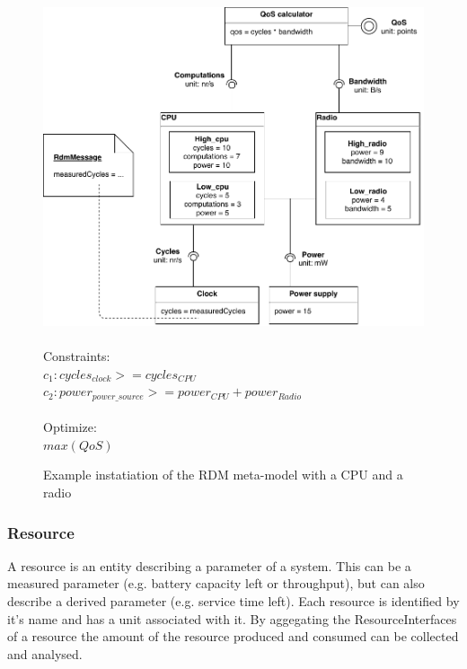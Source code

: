 \begin{figure}
\begingroup\centering
  \includegraphics[width=\linewidth]{resources/img/rdm_cpu_radio.pdf}\endgroup \\ \\
  \noindent Constraints: \\
$c_1: cycles_{clock} >= cycles_{CPU}$ \\
$c_2: power_{power\_source} >= power_{CPU}+power_{Radio} $ \\ \\
\noindent Optimize:\\$max(QoS)$
\caption{Example instatiation of the RDM meta-model with a CPU and a radio}
  \label{fig:rdm_cpu_radio}
\end{figure}

\subsubsection{Resource}
A resource is an entity describing a parameter of a system. This can be a measured parameter (e.g. battery capacity left or throughput), but can also describe a derived parameter (e.g. service time left). Each resource is identified by it's name and has a unit associated with it. By aggegating the ResourceInterfaces of a resource the amount of the resource produced and consumed can be collected and analysed.

